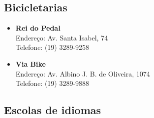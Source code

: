 \subsection{Bicicletarias}

\begin{itemize}
    \item   \textbf{Rei do Pedal}
        \\Endereço: Av. Santa Isabel, 74
        \\Telefone: (19) 3289-9258

    \item   \textbf{Via Bike}
        \\Endereço: Av. Albino J. B. de Oliveira, 1074
        \\Telefone: (19) 3289-9888
\end{itemize}

\subsection{Escolas de idiomas}

